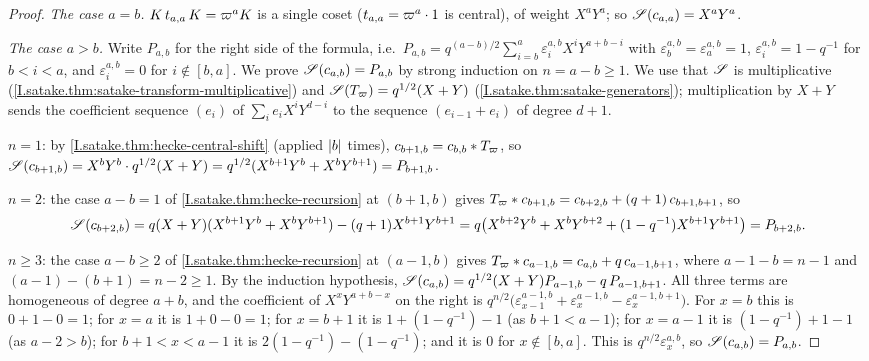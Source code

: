 \begin{theorem}[triangularity]
\end{theorem}
\begin{proof}
\emph{The case $a=b$.} $K\,t_{a,a}\,K=\varpi^aK$ is a single coset ($t_{a,a}=\varpi^a\cdot1$ is central), of weight
$X^aY^a$; so $\mathscr{S}(c_{a,a})=X^aY^a$.

\emph{The case $a>b$.} Write $P_{a,b}$ for the right side of the formula, i.e.\
$P_{a,b}=q^{(a-b)/2}\sum_{i=b}^a\varepsilon^{a,b}_iX^iY^{a+b-i}$ with $\varepsilon^{a,b}_b=\varepsilon^{a,b}_a=1$,
$\varepsilon^{a,b}_i=1-q^{-1}$ for $b<i<a$, and $\varepsilon^{a,b}_i=0$ for $i\notin[b,a]$. We prove
$\mathscr{S}(c_{a,b})=P_{a,b}$ by strong induction on $n=a-b\ge1$. We use that $\mathscr{S}$ is multiplicative
(\cref{I.satake.thm:satake-transform-multiplicative}) and $\mathscr{S}(T_\varpi)=q^{1/2}(X+Y)$
(\cref{I.satake.thm:satake-generators}); multiplication by $X+Y$ sends the coefficient sequence $(e_i)$ of
$\sum_ie_iX^iY^{d-i}$ to the sequence $(e_{i-1}+e_i)$ of degree $d+1$.

$n=1$: by \cref{I.satake.thm:hecke-central-shift} (applied $\lvert b\rvert$ times), $c_{b+1,b}=c_{b,b}*T_\varpi$, so
$\mathscr{S}(c_{b+1,b})=X^bY^b\cdot q^{1/2}(X+Y)=q^{1/2}(X^{b+1}Y^b+X^bY^{b+1})=P_{b+1,b}$.

$n=2$: the case $a-b=1$ of \cref{I.satake.thm:hecke-recursion} at $(b+1,b)$ gives
$T_\varpi*c_{b+1,b}=c_{b+2,b}+(q+1)\,c_{b+1,b+1}$, so
\[
  \mathscr{S}(c_{b+2,b})=q(X+Y)(X^{b+1}Y^b+X^bY^{b+1})-(q+1)X^{b+1}Y^{b+1}
  =q\bigl(X^{b+2}Y^b+X^bY^{b+2}+(1-q^{-1})X^{b+1}Y^{b+1}\bigr)=P_{b+2,b}.
\]

$n\ge3$: the case $a-b\ge2$ of \cref{I.satake.thm:hecke-recursion} at $(a-1,b)$ gives
$T_\varpi*c_{a-1,b}=c_{a,b}+q\,c_{a-1,b+1}$, where $a-1-b=n-1$ and $(a-1)-(b+1)=n-2\ge1$. By the induction hypothesis,
$\mathscr{S}(c_{a,b})=q^{1/2}(X+Y)P_{a-1,b}-q\,P_{a-1,b+1}$. All three terms are homogeneous of degree $a+b$, and the
coefficient of $X^xY^{a+b-x}$ on the right is $q^{n/2}\bigl(\varepsilon^{a-1,b}_{x-1}+\varepsilon^{a-1,b}_x-\varepsilon^{a-1,b+1}_x\bigr)$.
For $x=b$ this is $0+1-0=1$; for $x=a$ it is $1+0-0=1$; for $x=b+1$ it is $1+(1-q^{-1})-1$ (as $b+1<a-1$); for $x=a-1$ it
is $(1-q^{-1})+1-1$ (as $a-2>b$); for $b+1<x<a-1$ it is $2(1-q^{-1})-(1-q^{-1})$; and it is $0$ for $x\notin[b,a]$. This
is $q^{n/2}\varepsilon^{a,b}_x$, so $\mathscr{S}(c_{a,b})=P_{a,b}$.
\end{proof}

